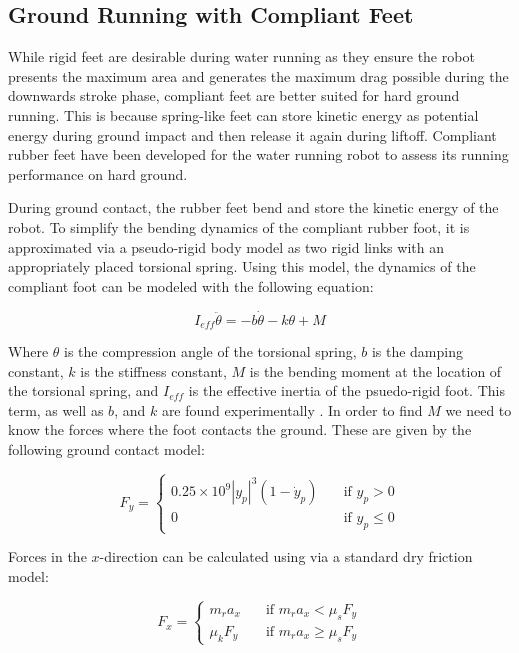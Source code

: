 \documentclass[letterpaper]{article}
\begin{document}
\subsection{Ground Running with Compliant Feet}
While rigid feet are desirable during water running as they ensure the robot presents the maximum area and generates the maximum drag possible during the downwards stroke phase, compliant feet are better suited for hard ground running. This is because spring-like feet can store kinetic energy as potential energy during ground impact and  then release it again during liftoff. Compliant rubber feet have been developed for the water running robot to assess its running performance on hard ground.

During ground contact, the rubber feet bend and store the kinetic energy of the robot. To simplify the bending dynamics of the compliant rubber foot, it is approximated via a pseudo-rigid body model as two rigid links with an appropriately placed torsional spring. Using this model, the dynamics of the compliant foot can be modeled with the following equation:

\begin{equation}
	I_{eff} \ddot{\theta} = -b\dot{\theta} - k\theta + M
\end{equation} 

Where $\theta$ is the compression angle of the torsional spring, $b$ is the damping constant, $k$ is the stiffness constant, $M$ is the bending moment at the location of the torsional spring, and $I_{eff}$ is the effective inertia of the psuedo-rigid foot. This term, as well as $b$, and $k$ are found experimentally \cite{Park2009}. In order to find $M$ we need to know the forces where the foot contacts the ground. These are given by the following ground contact model:

\begin{equation}
F_y = \left\{ \begin{array}{ll} 0.25 \times 10^9 |y_p|^3 (1 - \dot{y}_p) & \quad \textrm{if $y_p > 0$} \\ 0 & \quad \textrm{if $y_p \le 0$} \end{array} \right.
\end{equation}

\noindent Forces in the $x$-direction can be calculated using via a standard dry friction model:

\begin{equation}
F_x = \left\{ \begin{array}{ll} m_r a_x & \quad \textrm{if $m_r a_x < \mu_s F_y$} \\
			                   \mu_k F_y &\quad \textrm{if $m_r a_x \ge \mu_s F_y$}
			  \end{array} \right.
\end{equation}
\end{document}
